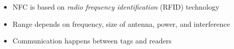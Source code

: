 \documentclass[unknownkeysallowed]{beamer}
\begin{document}
\begin{frame}
\begin{center}
\begin{minipage}{.9\textwidth}
\begin{center}
      \end{center}
      \vspace{2mm}
      \begin{itemize}
        \item{NFC is based on \textit{radio frequency identification} (RFID) technology}
        \pause
        \item{Range depends on frequency, size of antenna, power, and interference}
        \pause
        \item{Communication happens between tags and readers}
      \end{itemize}
    \end{minipage}\end{center}
\end{frame}
\end{document}
